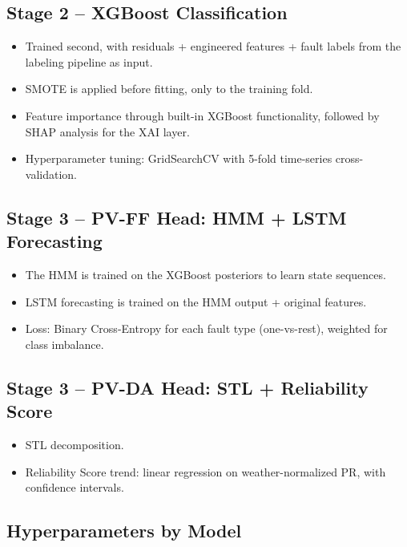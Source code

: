 \documentclass[11pt,a4paper]{article}
\begin{document}
\subsection*{Stage 2 -- XGBoost Classification}
\begin{itemize}
    \item Trained second, with residuals + engineered features + fault labels from the labeling pipeline as input.
    \item SMOTE is applied before fitting, only to the training fold.
    \item Feature importance through built-in XGBoost functionality, followed by SHAP analysis for the XAI layer.
    \item Hyperparameter tuning: GridSearchCV with 5-fold time-series cross-validation.
\end{itemize}

\subsection*{Stage 3 -- PV-FF Head: HMM + LSTM Forecasting}
\begin{itemize}
    \item The HMM is trained on the XGBoost posteriors to learn state sequences.
    \item LSTM forecasting is trained on the HMM output + original features.
    \item Loss: Binary Cross-Entropy for each fault type (one-vs-rest), weighted for class imbalance.
\end{itemize}

\subsection*{Stage 3 -- PV-DA Head: STL + Reliability Score}
\begin{itemize}
    \item STL decomposition.
    \item Reliability Score trend: linear regression on weather-normalized PR, with confidence intervals.
\end{itemize}

\subsection*{Hyperparameters by Model}
\end{document}
